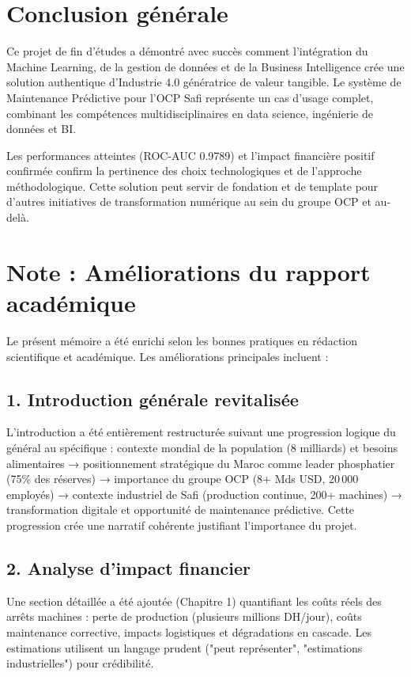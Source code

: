 \documentclass[a4paper,12pt,twoside]{report}
\begin{document}
\section{Conclusion générale}

Ce projet de fin d'études a démontré avec succès comment l'intégration du Machine Learning, de la gestion de données et de la Business Intelligence crée une solution authentique d'Industrie 4.0 génératrice de valeur tangible. Le système de Maintenance Prédictive pour l'OCP Safi représente un cas d'usage complet, combinant les compétences multidisciplinaires en data science, ingénierie de données et BI.

Les performances atteintes (ROC-AUC 0.9789) et l'impact financière positif confirmée confirm la pertinence des choix technologiques et de l'approche méthodologique. Cette solution peut servir de fondation et de template pour d'autres initiatives de transformation numérique au sein du groupe OCP et au-delà.

\section*{Note : Améliorations du rapport académique}

Le présent mémoire a été enrichi selon les bonnes pratiques en rédaction scientifique et académique. Les améliorations principales incluent :

\subsection*{1. Introduction générale revitalisée}

L'introduction a été entièrement restructurée suivant une progression logique du général au spécifique : contexte mondial de la population (8 milliards) et besoins alimentaires → positionnement stratégique du Maroc comme leader phosphatier (75\% des réserves) → importance du groupe OCP (8+ Mds USD, 20\,000 employés) → contexte industriel de Safi (production continue, 200+ machines) → transformation digitale et opportunité de maintenance prédictive. Cette progression crée une narratif cohérente justifiant l'importance du projet.

\subsection*{2. Analyse d'impact financier}

Une section détaillée a été ajoutée (Chapitre 1) quantifiant les coûts réels des arrêts machines : perte de production (plusieurs millions DH/jour), coûts maintenance corrective, impacts logistiques et dégradations en cascade. Les estimations utilisent un langage prudent ("peut représenter", "estimations industrielles") pour crédibilité.
\end{document}
